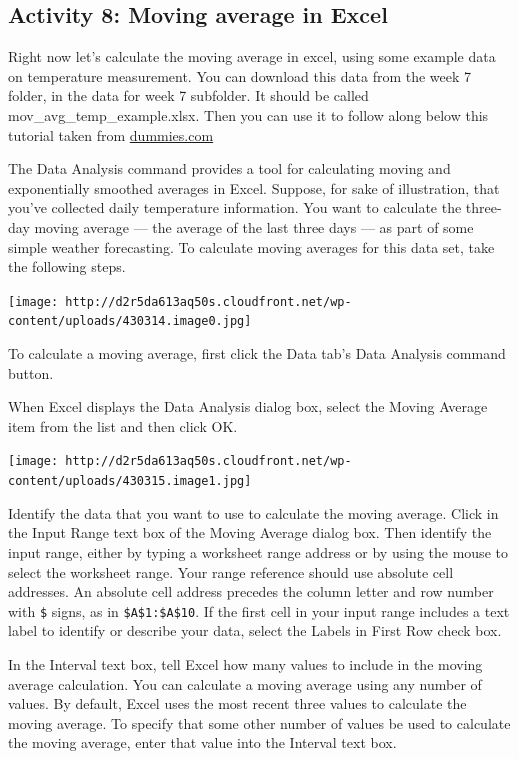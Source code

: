 \documentclass[]{book}
\theoremstyle{definition}
\theoremstyle{definition}
\theoremstyle{definition}
\theoremstyle{remark}
\begin{document}
\hypertarget{activity-8-moving-average-in-excel}{%
\subsection{Activity 8: Moving average in
Excel}\label{activity-8-moving-average-in-excel}}

 Right now let's calculate the moving average in excel, using some
example data on temperature measurement. You can download this data from
the week 7 folder, in the data for week 7 subfolder. It should be called
mov\_avg\_temp\_example.xlsx. Then you can use it to follow along below
this tutorial taken from
\href{http://www.dummies.com/software/microsoft-office/excel/how-to-calculate-moving-averages-in-excel/}{dummies.com}

The Data Analysis command provides a tool for calculating moving and
exponentially smoothed averages in Excel. Suppose, for sake of
illustration, that you've collected daily temperature information. You
want to calculate the three-day moving average --- the average of the
last three days --- as part of some simple weather forecasting. To
calculate moving averages for this data set, take the following steps.

\texttt{[image: http://d2r5da613aq50s.cloudfront.net/wp-content/uploads/430314.image0.jpg]}

To calculate a moving average, first click the Data tab's Data Analysis
command button.

When Excel displays the Data Analysis dialog box, select the Moving
Average item from the list and then click OK.

\texttt{[image: http://d2r5da613aq50s.cloudfront.net/wp-content/uploads/430315.image1.jpg]}

Identify the data that you want to use to calculate the moving average.
Click in the Input Range text box of the Moving Average dialog box. Then
identify the input range, either by typing a worksheet range address or
by using the mouse to select the worksheet range. Your range reference
should use absolute cell addresses. An absolute cell address precedes
the column letter and row number with \texttt{\$} signs, as in
\texttt{\$A\$1:\$A\$10}. If the first cell in your input range includes
a text label to identify or describe your data, select the Labels in
First Row check box.

In the Interval text box, tell Excel how many values to include in the
moving average calculation. You can calculate a moving average using any
number of values. By default, Excel uses the most recent three values to
calculate the moving average. To specify that some other number of
values be used to calculate the moving average, enter that value into
the Interval text box.
\end{document}
